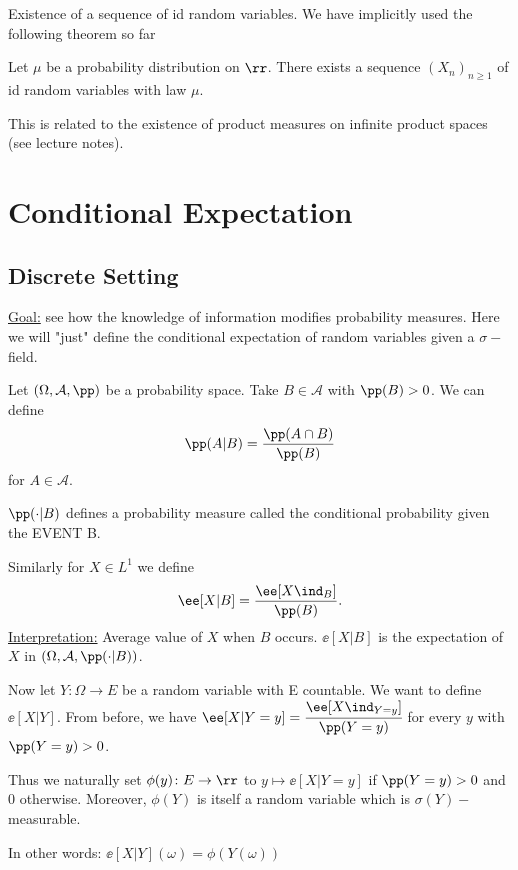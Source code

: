 \documentclass[../main.tex]{subfiles}
\begin{document}
\begin{remark}
    Existence of a sequence of id random variables. We have implicitly used the
    following theorem so far
\begin{theorem}
  Let $\mu$ be a probability distribution on $\rr$. There exists a sequence
  $(X_n)_{n \geq 1}$ of id random variables with law $\mu$.
\end{theorem}
    This is related to the existence of product measures on infinite product
    spaces (see lecture notes).
\end{remark}

\section{Conditional Expectation}
\subsection{Discrete Setting}
\underline{Goal:} see how the knowledge of information modifies probability
measures. Here we will "just" define the conditional expectation of random
variables given a $\sigma-$field.

\vspace{0.5em}
\noindent
Let $(\Omega, \mathcal{A}, \pp)$ be a probability space. Take $B \in
\mathcal{A}$ with $\pp(B) > 0$. We can define
\[
  \pp(A | B) = \frac{\pp(A \cap B)}{\pp(B)} 
\]
for $A \in \mathcal{A}$. 

\vspace{0.5em}
\noindent
$\pp(\cdot \vert B)$ defines a probability measure called the conditional
probability given the EVENT B.

\vspace{0.5em}
\noindent
Similarly for $X \in L^1$ we define 
\[
  \ee[X | B] = \frac{\ee[X \ind_{B}]}{\pp(B)} 
.\] 
\underline{Interpretation:} Average value of $X$ when $B$ occurs. $\ee[X | B]$
is the expectation of $X$ in $(\Omega, \mathcal{A}, \pp(\cdot | B))$.

\vspace{1em}
\noindent
Now let $Y \colon \Omega \to E$ be a random variable with E countable. We want
to define $\ee[X | Y]$. From before, we have $\ee[X | Y = y] = \cfrac{\ee[X \ind_{Y =
y}]}{\pp(Y = y)}$ for every $y$ with $\pp(Y = y) > 0$. 

\vspace{0.5em}
\noindent
Thus we naturally set $\phi(y) \colon E \to \rr$ to $y \mapsto \ee[X | Y = y]$
if $\pp(Y = y) > 0$ and $0$ otherwise. Moreover, $\phi(Y)$ is itself a random
variable which is $\sigma(Y)-$measurable.

\vspace{0.3em}\noindent
In other words: $\ee[X | Y] (\omega) = \phi(Y(\omega))$
\end{document}
